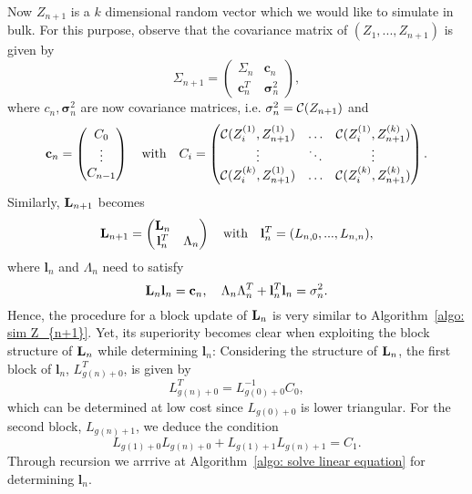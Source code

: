 Now \(Z_{n+1}\) is a \(k\) dimensional random vector which we would like to
simulate in bulk. For this purpose, observe that the covariance matrix of
$(Z_1,...,Z_{n+1})$ is given by
\[
	\Sigma_{n+1} = \begin{pmatrix} 
		\Sigma_n & \mathbf{c}_n \\
		\mathbf{c}_n^T 	& \mathbf{\sigma}_n^2
	\end{pmatrix},
\]
where $c_n,  \mathbf{\sigma}_n^2$ are now covariance matrices, i.e. $\mathbf{\sigma}_n^2 = \mathcal{C}(Z_{n+1})$ and
\[  \mathbf{c}_n = 
	\begin{pmatrix}
	C_0 \\ \vdots \\ C_{n-1}
	\end{pmatrix}  \quad \text{with} \quad 
	C_i = 
	\begin{pmatrix}
		\mathcal{C}(Z_i^{(1)},Z_{n+1}^{(1)}) & \hdots & \mathcal{C}(Z_i^{(1)}, Z_{n+1}^{(k)}) \\
		\vdots & \ddots & \vdots \\
		\mathcal{C}(Z_i^{(k)},Z_{n+1}^{(1)}) & \hdots & \mathcal{C}(Z_i^{(k)}, Z_{n+1}^{(k)})
	\end{pmatrix}.
		 \]
Similarly, $\mathbf{L}_{n+1}$ becomes
\[ \mathbf{L}_{n+1} = 
\begin{pmatrix}
	\mathbf{L}_n & \\
	\mathbf{l}_n^T & \Lambda_n
\end{pmatrix} \quad \text{with} \quad \mathbf{l}_n^T = (L_{n,0},...,L_{n,n}), \]
where $\mathbf{l}_n$ and $\Lambda_n$ need to satisfy 
\[
	\mathbf{L}_n \mathbf{l}_n = \mathbf{c}_n, \quad \Lambda_n \Lambda_n^T + \mathbf{l}_n^T \mathbf{l}_n= \mathbf{\sigma}_n^2.
\]
Hence, the procedure for a block update of $\mathbf{L}_n$ is very similar to
Algorithm~\ref{algo: sim Z_{n+1}}. Yet, its superiority becomes clear when
exploiting the block structure of $\mathbf{L}_n$ while determining $\mathbf{l}_n$:
Considering the structure of $\mathbf{L}_n$, the first block of $\mathbf{l}_n$,
$L_{g(n)+0}^T$, is given by
\[
	L_{g(n)+0}^T = L_{g(0)+0}^{-1}C_0,
\]
which can be determined at low cost since $L_{g(0)+0}$ is lower triangular. For
the second block, $L_{g(n)+1}$, we deduce the condition
\[
	L_{g(1)+0} L_{g(n)+0} + L_{g(1)+1} L_{g(n)+1} = C_1.
\]
Through recursion we arrrive at Algorithm~\ref{algo: solve linear equation} for determining $\mathbf{l}_n$.
